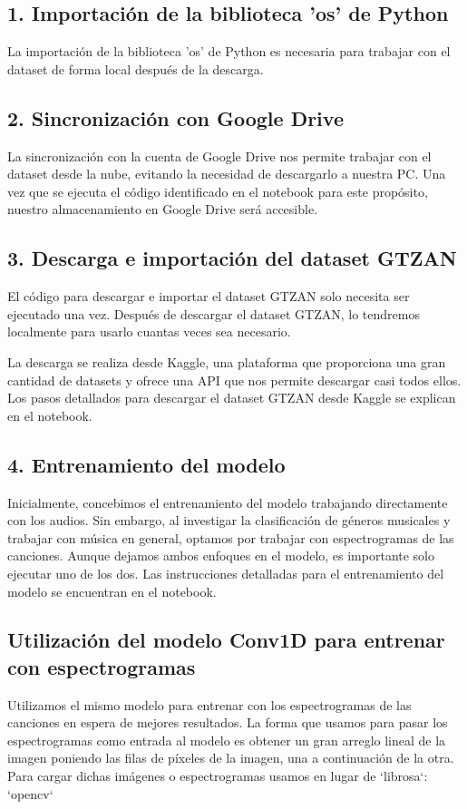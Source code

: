 \documentclass[colorinlistoftodos,twoside,twocolumn,10pt]{article} %
\begin{document}
\subsection*{1. Importaci\'on de la biblioteca 'os' de Python}

La importaci\'on de la biblioteca 'os' de Python es necesaria para trabajar con el dataset de forma local despu\'es de la descarga.

\subsection*{2. Sincronizaci\'on con Google Drive}

La sincronizaci\'on con la cuenta de Google Drive nos permite trabajar con el dataset desde la nube, evitando la necesidad de descargarlo a nuestra PC. Una vez que se ejecuta el c\'odigo identificado en el notebook para este prop\'osito, nuestro almacenamiento en Google Drive ser\'a accesible.

\subsection*{3. Descarga e importaci\'on del dataset GTZAN}

El c\'odigo para descargar e importar el dataset GTZAN solo necesita ser ejecutado una vez. Despu\'es de descargar el dataset GTZAN, lo tendremos localmente para usarlo cuantas veces sea necesario.

La descarga se realiza desde Kaggle, una plataforma que proporciona una gran cantidad de datasets y ofrece una API que nos permite descargar casi todos ellos. Los pasos detallados para descargar el dataset GTZAN desde Kaggle se explican en el notebook.

\subsection*{4. Entrenamiento del modelo}

Inicialmente, concebimos el entrenamiento del modelo trabajando directamente con los audios. Sin embargo, al investigar la clasificaci\'on de g\'eneros musicales y trabajar con m\'usica en general, optamos por trabajar con espectrogramas de las canciones. Aunque dejamos ambos enfoques en el modelo, es importante solo ejecutar uno de los dos. Las instrucciones detalladas para el entrenamiento del modelo se encuentran en el notebook.

\subsection*{Utilizaci\'on del modelo Conv1D para entrenar con espectrogramas}
Utilizamos el mismo modelo para entrenar con los espectrogramas de las canciones en espera de mejores resultados. La forma que usamos para pasar los espectrogramas como entrada al modelo es obtener un gran arreglo lineal de la imagen poniendo las filas de p\'ixeles de la imagen, una a continuaci\'on de la otra.
Para cargar dichas im\'agenes o espectrogramas usamos en lugar de `librosa`: `opencv`
\end{document}
